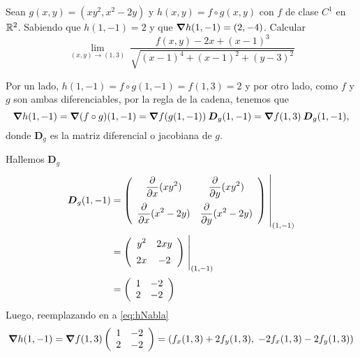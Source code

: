 \begin{solution}
    Sean $g(x,y)=(xy^2,x^2-2y)$ y $h(x,y)=f \circ g(x,y)$ con $f$ de clase $C^1$ en $\mathbb{R}^2$. Sabiendo que $h(1,-1)=2$ y que $\grad h(1,-1)=(2,-4)$. Calcular
    \[
        \lim_{(x,y)\to (1,3)} \ 
        \frac{f(x,y)-2x+(x-1)^3}{\sqrt{(x-1)^4+(x-1)^2+(y-3)^2}}       
    \]

 Por un lado,      $h(1,-1)= f\circ g (1,-1) =  f(1,3)=2$  y por otro lado,  como $f$ y $g$ son ambas diferenciables,  por la regla de la cadena,  tenemos que
    \begin{equation}
        \grad h(1,-1)=\grad (f\circ g)(1,-1)=\grad f(g(1,-1)) \:\boldsymbol{D}_g(1,-1) = \grad f (1,3) \:\boldsymbol{D}_g(1,-1),  \label{eq:hNabla}
    \end{equation}    donde $\boldsymbol{D}_g$ es la matriz diferencial o  jacobiana de $g$.

    
    \noindent  Hallemos $\boldsymbol{D}_g$
    \begin{align*}
        \boldsymbol{D}_g(1,-1) & =
        \left(\begin{array}{cc}
                      \displaystyle\partialx (xy^2)            & \displaystyle\partialy (xy^2)           \\[10pt]
                      \displaystyle\partialx  (x^2 -2y) & \displaystyle\partialy (x^2 -2y)
                  \end{array}\right)\left.\rule{0pt}{1.1cm}\right\rvert_{(1,-1)}             \\[2pt]
                              & =\left(\begin{array}{cc}
                                               \displaystyle y^2                 & \displaystyle 2xy              \\[5pt]
                                               \displaystyle   2x & \displaystyle -2
                                           \end{array}\right)\left.\rule{0pt}{0.7cm}\right\rvert_{(1,-1)} \\[2pt]
                              & =\left(\begin{array}{cc}
                                               1    & -2    \\
                                               2 & -2
                                           \end{array}\right)
    \end{align*}
    Luego, reemplazando en  a   \eqref{eq:hNabla}
    \[
        \grad h(1,-1) = \grad f(1,3)\left(\begin{array}{cc}
                1   & -2    \\
                2 & -2
            \end{array}\right) = \left(f_x(1,3) + 2f_y(1,3),\;-2f_x(1,3)-2f_y(1,3)\right)
    \]


\end{solution}
